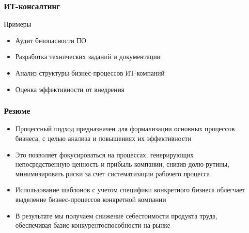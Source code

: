 \documentclass{../industrial-development}
\begin{document}
\begin{frame} \frametitle{ИТ-консалтинг}
	\begin{block}{Примеры}
		\begin{itemize}
			\item Аудит безопасности ПО
			\item Разработка технических заданий и документации
			\item Анализ структуры бизнес-процессов ИТ-компаний
			\item Оценка эффективности от внедрения
		\end{itemize}
	\end{block}
\end{frame}


\begin{frame} \frametitle{Резюме}
	\begin{itemize}
		\item Процессный подход предназначен для формализации основных процессов бизнеса, с целью анализа и повышениях их эффективности
		\item Это позволяет фокусироваться на процессах, генерирующих непосредственную ценность и прибыль компании, снизив долю рутины, минимизировать риски за счет систематизации рабочего процесса
		\item Использование шаблонов с учетом специфики конкретного бизнеса облегчает выделение бизнес-процессов конкретной компании
		\item В результате мы получаем снижение себестоимости продукта труда, обеспечивая базис конкурентоспособности на рынке
	\end{itemize}
\end{frame}
\end{document}

